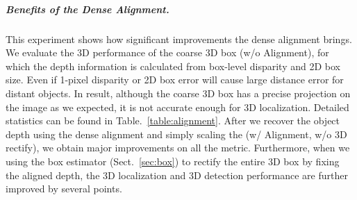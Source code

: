 \documentclass[10pt,twocolumn,letterpaper]{article}
\begin{document}
	\begin{table}
		\begin{center}
			\renewcommand{\arraystretch}{1.3}
		\end{center}
		\caption{Improvements of using our dense alignment and 3D box rectify, evaluated on KITTI \textit{validation set}.}
		\label{table:alignment}
	\end{table}
	\vspace{-0.2cm}
	{\setlength{\parindent}{0cm}
		\subparagraph*{Benefits of the Dense Alignment.} This experiment shows how significant improvements the dense alignment brings. We evaluate the 3D performance of the coarse 3D box (w/o Alignment), for which the depth information is calculated from box-level disparity and 2D box size. Even if 1-pixel disparity or 2D box error will cause large distance error for distant objects. In result, although the coarse 3D box has a precise projection on the image as we expected, it is not accurate enough for 3D localization. Detailed statistics can be found in Table.~\ref{table:alignment}. After we recover the object depth using the dense alignment and simply scaling the  (w/ Alignment, w/o 3D rectify), we obtain major improvements on all the metric.
Furthermore, when we using the box estimator (Sect.~\ref{sec:box}) to rectify the entire 3D box by fixing the aligned depth, the 3D localization and 3D detection performance are further improved by several points.
	}
\end{document}
